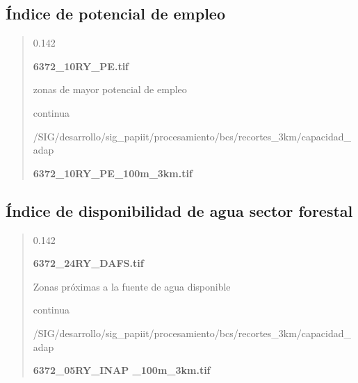\documentclass[letterpaper,10pt,spanish]{sphinxmanual}
\begin{document}
\subsection{Índice de potencial de empleo}
\label{\detokenize{resiliencia_bcs:indice-de-potencial-de-empleo}}
\begin{quote}

 0.142

 {\color{red}\bfseries{}\textbar{}6372\_10RY\_PE.tif\textbar{}}

 zonas de mayor potencial de empleo

 continua


 /SIG/desarrollo/sig\_papiit/procesamiento/bcs/recortes\_3km/capacidad\_adap

  {\color{red}\bfseries{}\textbar{}6372\_10RY\_PE\_100m\_3km.tif\textbar{}}

\end{quote}


\subsection{Índice de disponibilidad de agua sector forestal}
\label{\detokenize{resiliencia_bcs:indice-de-disponibilidad-de-agua-sector-forestal}}
\begin{quote}

 0.142

 {\color{red}\bfseries{}\textbar{}6372\_24RY\_DAFS.tif\textbar{}}

  Zonas próximas a la fuente de agua disponible

 continua


 /SIG/desarrollo/sig\_papiit/procesamiento/bcs/recortes\_3km/capacidad\_adap

  {\color{red}\bfseries{}\textbar{}6372\_05RY\_INAP \_100m\_3km.tif\textbar{}}

 \textbar{}\textbar{}
\end{quote}



\renewcommand{\indexname}{Índice}
\printindex
\end{document}
